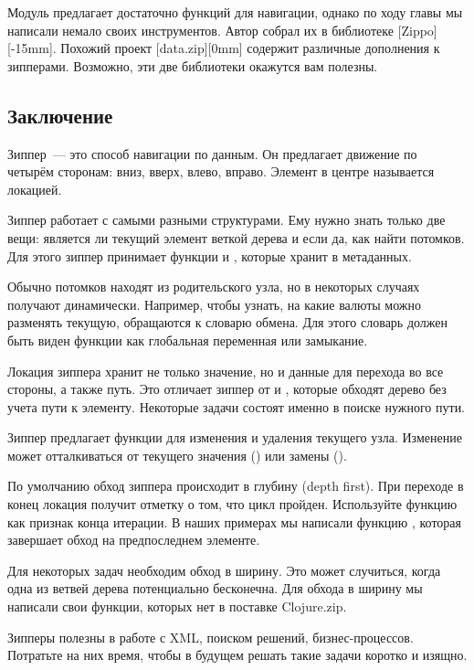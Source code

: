 Модуль  предлагает достаточно функций для навигации, однако по
ходу главы мы написали немало своих инструментов. Автор собрал их в библиотеке
[Zippo][-15mm]. Похожий проект
[data.zip][0mm] содержит различные дополнения к
зипперами. Возможно, эти две библиотеки окажутся вам полезны.

\subsection{Заключение}

Зиппер~--- это способ навигации по данным. Он предлагает движение по четырём
сторонам: вниз, вверх, влево, вправо. Элемент в центре называется локацией.

Зиппер работает с самыми разными структурами. Ему нужно знать только две вещи:
является ли текущий элемент веткой дерева и если да, как найти потомков. Для
этого зиппер принимает функции  и , которые хранит в
метаданных.

Обычно потомков находят из родительского узла, но в некоторых случаях получают
динамически. Например, чтобы узнать, на какие валюты можно разменять текущую,
обращаются к словарю обмена. Для этого словарь должен быть виден функции
 как глобальная переменная или замыкание.

Локация зиппера хранит не только значение, но и данные для перехода во все
стороны, а также путь. Это отличает зиппер от  и ,
которые обходят дерево без учета пути к элементу. Некоторые задачи состоят
именно в поиске нужного пути.

Зиппер предлагает функции для изменения и удаления текущего узла. Изменение
может отталкиваться от текущего значения () или замены
().

По умолчанию обход зиппера происходит в глубину (depth first). При переходе в
конец локация получит отметку о том, что цикл пройден. Используйте функцию
 как признак конца итерации. В наших примерах мы написали функцию
, которая завершает обход на предпоследнем элементе.

Для некоторых задач необходим обход в ширину. Это может случиться, когда одна из
ветвей дерева потенциально бесконечна. Для обхода в ширину мы написали свои
функции, которых нет в поставке Clojure.zip.

Зипперы полезны в работе с XML, поиском решений, бизнес-процессов. Потратьте на
них время, чтобы в будущем решать такие задачи коротко и изящно.
